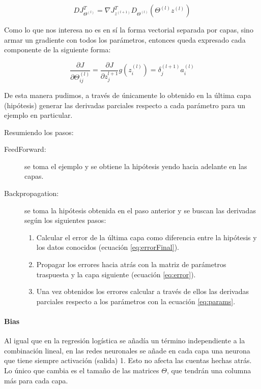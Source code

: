 \begin{equation}
D J_{\Theta^{(l)}}^T = \nabla J_{z^{(l+1)}}^T D_{\Theta^{(l)}} (\Theta^{(l)} z^{(l)})
\end{equation}

Como lo que nos interesa no es en sí la forma vectorial separada por capas, sino armar un gradiente con todos los parámetros, entonces queda expresado cada componente de la siguiente forma:

\begin{equation} \label{eq:params}
\frac{\partial J}{\partial \Theta_{ij}^{(l)}} = \frac{\partial J}{\partial z_j^{l+1}}g(z_i^{(l)}) = \delta_j^{(l+1)}a_i^{(l)}
\end{equation}

De esta manera pudimos, a través de únicamente lo obtenido en la última capa (hipótesis) generar las derivadas parciales respecto a cada parámetro para un ejemplo en particular.

Resumiendo los pasos:
\begin{description}
\item[FeedForward:] se toma el ejemplo y se obtiene la hipótesis yendo hacia adelante en las capas.
\item[Backpropagation:] se toma la hipótesis obtenida en el paso anterior y se buscan las derivadas según los siguientes pasos:
	\begin{enumerate}
	\item Calcular el error de la última capa como diferencia entre la hipótesis y los datos conocidos (ecuación \ref{eq:errorFinal}).
	\item Propagar los errores hacia atrás con la matriz de parámetros traspuesta y la capa siguiente (ecuación \ref{eq:error}).
	\item Una vez obtenidos los errores calcular a través de ellos las derivadas parciales respecto a los parámetros con la ecuación \ref{eq:params}.
	
	\end{enumerate}
\end{description}

\paragraph{Bias} Al igual que en la regresión logística se añadía un término independiente a la combinación lineal, en las redes neuronales se añade en cada capa una neurona que tiene siempre activación (salida) 1. Esto no afecta las cuentas hechas atrás. Lo único que cambia es el tamaño de las matrices $\Theta$, que tendrán una columna más para cada capa.

